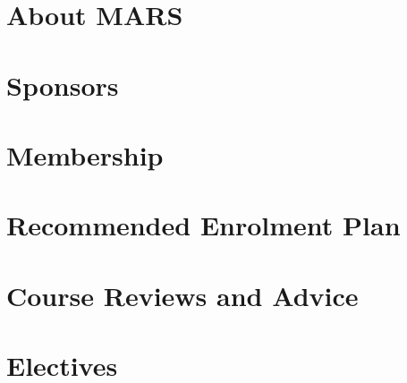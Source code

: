 \documentclass[a4paper,12pt]{report}
\begin{document}
\chapter*{About MARS}
\chapter*{Sponsors} %
\chapter*{Membership}
\chapter*{Recommended Enrolment Plan}
\chapter*{Course Reviews and Advice}
\chapter*{Electives}
\newpage
\end{document}
